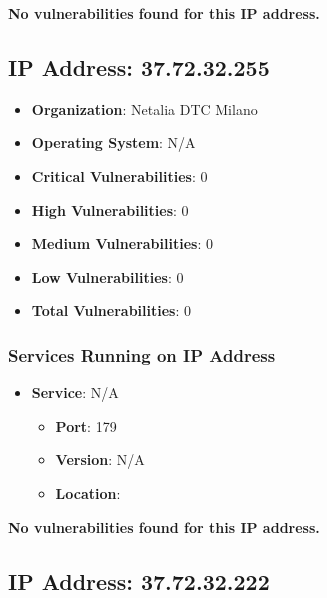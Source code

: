 \documentclass{article}
\begin{document}
\textbf{No vulnerabilities found for this IP address.}




\clearpage



\subsection{IP Address: 37.72.32.255}

\begin{itemize}
    \item \textbf{Organization}: Netalia DTC Milano
    \item \textbf{Operating System}:  N/A 
    \item \textbf{Critical Vulnerabilities}: 0
    \item \textbf{High Vulnerabilities}: 0
    \item \textbf{Medium Vulnerabilities}: 0
    \item \textbf{Low Vulnerabilities}: 0
    \item \textbf{Total Vulnerabilities}: 0
\end{itemize}

\subsubsection*{Services Running on IP Address}

\begin{itemize}
    
        \item \textbf{Service}: N/A
        \begin{itemize}
            \item \textbf{Port}: 179
            \item \textbf{Version}:  N/A 
            \item \textbf{Location}: \href{  }{  }
        \end{itemize}
    
\end{itemize}


\textbf{No vulnerabilities found for this IP address.}




\clearpage



\subsection{IP Address: 37.72.32.222}
\end{document}
